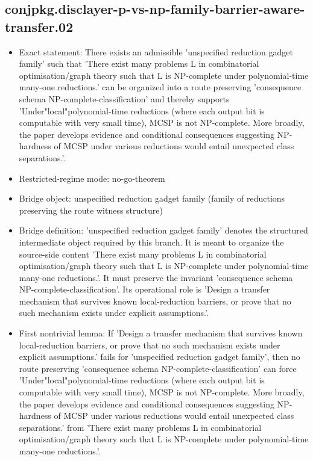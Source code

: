 \documentclass[11pt]{article}
\begin{document}
\subsection*{conjpkg.disclayer-p-vs-np-family-barrier-aware-transfer.02}
\begin{itemize}
\item Exact statement: There exists an admissible 'unspecified reduction gadget family' such that 'There exist many problems L in combinatorial optimisation/graph theory such that L is NP-complete under polynomial-time many-one reductions.' can be organized into a route preserving 'consequence schema NP-complete-classification' and thereby supports 'Under"local"polynomial-time reductions (where each output bit is computable with very small time), MCSP is not NP-complete. More broadly, the paper develops evidence and conditional consequences suggesting NP-hardness of MCSP under various reductions would entail unexpected class separations.'.
\item Restricted-regime mode: no-go-theorem
\item Bridge object: unspecified reduction gadget family (family of reductions preserving the route witness structure)
\item Bridge definition: 'unspecified reduction gadget family' denotes the structured intermediate object required by this branch. It is meant to organize the source-side content 'There exist many problems L in combinatorial optimisation/graph theory such that L is NP-complete under polynomial-time many-one reductions.'. It must preserve the invariant 'consequence schema NP-complete-classification'. Its operational role is 'Design a transfer mechanism that survives known local-reduction barriers, or prove that no such mechanism exists under explicit assumptions.'.
\item First nontrivial lemma: If 'Design a transfer mechanism that survives known local-reduction barriers, or prove that no such mechanism exists under explicit assumptions.' fails for 'unspecified reduction gadget family', then no route preserving 'consequence schema NP-complete-classification' can force 'Under"local"polynomial-time reductions (where each output bit is computable with very small time), MCSP is not NP-complete. More broadly, the paper develops evidence and conditional consequences suggesting NP-hardness of MCSP under various reductions would entail unexpected class separations.' from 'There exist many problems L in combinatorial optimisation/graph theory such that L is NP-complete under polynomial-time many-one reductions.'.

\end{itemize}
\end{document}
